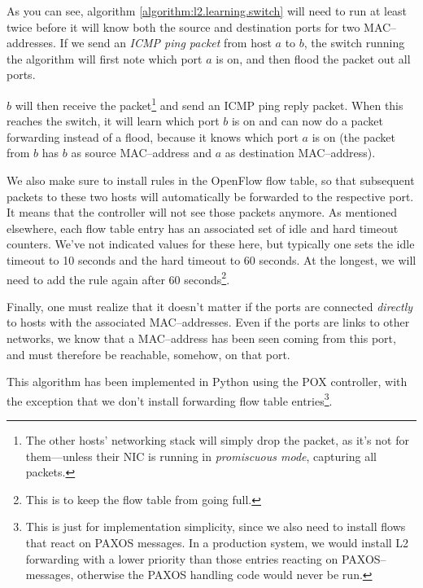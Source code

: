 As you can see, algorithm \ref{algorithm:l2.learning.switch} will need to
run at least twice before it will know both the source and destination ports
for two MAC--addresses.  If we send an \textit{\acs{ICMP} ping packet} from
host $a$ to $b$, the switch running the algorithm will first note which port
$a$ is on, and then flood the packet out all ports.

$b$ will then receive the packet\footnote{The other hosts' networking stack
will simply drop the packet, as it's not for them---unless their \acs{NIC} is
running in \textit{promiscuous mode}, capturing all packets.} and send an \acs{ICMP}
ping reply packet.  When this reaches the switch, it will learn which port
$b$ is on and can now do a packet forwarding instead of a flood, because it
knows which port $a$ is on (the packet from $b$ has $b$ as source
MAC--address and $a$ as destination MAC--address).

We also make sure to install rules in the OpenFlow flow table, so that
subsequent packets to these two hosts will automatically be forwarded to the
respective port.  It means that the controller will not see those packets
anymore.  As mentioned elsewhere, each flow table entry has an associated
set of idle and hard timeout counters.  We've not indicated values for these
here, but typically one sets the idle timeout to 10 seconds and the hard
timeout to 60 seconds.  At the longest, we will need to add the rule again
after 60 seconds\footnote{This is to keep the flow table from going full.}.

Finally, one must realize that it doesn't matter if the ports are connected
\textit{directly} to hosts with the associated MAC--addresses.  Even if the
ports are links to other networks, we know that a MAC--address has been seen
coming from this port, and must therefore be reachable, somehow, on that
port.

This algorithm has been implemented in Python using the POX controller, with
the exception that we don't install forwarding flow table
entries\footnote{This is just for implementation simplicity, since we also
need to install flows that react on PAXOS messages.  In a production
system, we would install L2 forwarding with a lower priority than those
entries reacting on PAXOS--messages, otherwise the PAXOS handling code would
never be run.}.
